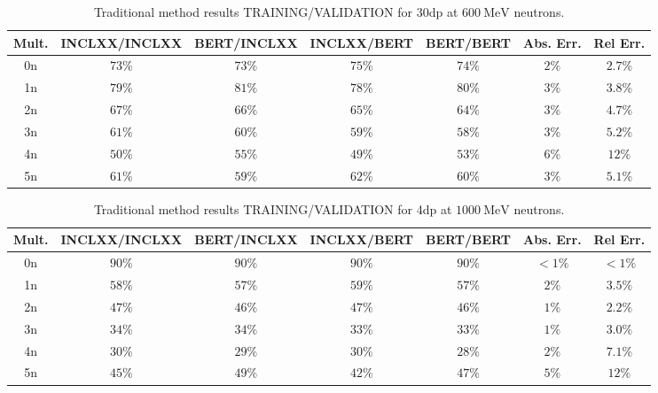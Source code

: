 \documentclass[10pt,a4paper]{report}
\newcommand{\MeV}[0]{\ \textrm{MeV}}
\begin{document}
\begin{table}[htbp] 
\centering
\caption{Traditional method results TRAINING/VALIDATION for \textrm{30dp} at ${600 \MeV}$ neutrons.}
\label{tab:30dp600}
\begin{tabular}{| c | c c c c | c c |} 
\hline
Mult. & INCLXX/INCLXX & BERT/INCLXX & INCLXX/BERT & BERT/BERT & Abs. Err. & Rel Err.   \\
\hline
0n    & ${73 \%}$     & ${73 \%}$   & ${75 \%}$   & ${74 \%}$ & ${2 \%}$  & ${2.7 \%}$ \\
1n    & ${79 \%}$     & ${81 \%}$   & ${78 \%}$   & ${80 \%}$ & ${3 \%}$  & ${3.8 \%}$ \\
2n    & ${67 \%}$     & ${66 \%}$   & ${65 \%}$   & ${64 \%}$ & ${3 \%}$  & ${4.7 \%}$ \\
3n    & ${61 \%}$     & ${60 \%}$   & ${59 \%}$   & ${58 \%}$ & ${3 \%}$  & ${5.2 \%}$ \\
4n    & ${50 \%}$     & ${55 \%}$   & ${49 \%}$   & ${53 \%}$ & ${6 \%}$  & ${12 \%}$  \\
5n    & ${61 \%}$     & ${59 \%}$   & ${62 \%}$   & ${60 \%}$ & ${3 \%}$  & ${5.1 \%}$ \\
\hline
\end{tabular}
\end{table}


\begin{table}[htbp] 
\centering
\caption{Traditional method results TRAINING/VALIDATION for \textrm{4dp} at ${1000 \MeV}$ neutrons.}
\label{tab:4dp1000}
\begin{tabular}{| c | c c c c | c c |} 
\hline
Mult. & INCLXX/INCLXX & BERT/INCLXX & INCLXX/BERT & BERT/BERT & Abs. Err. & Rel Err.   \\
\hline
0n    & ${90 \%}$     & ${90 \%}$   & ${90 \%}$   & ${90 \%}$ & ${<1 \%}$ & ${<1 \%}$  \\
1n    & ${58 \%}$     & ${57 \%}$   & ${59 \%}$   & ${57 \%}$ & ${2 \%}$  & ${3.5 \%}$ \\
2n    & ${47 \%}$     & ${46 \%}$   & ${47 \%}$   & ${46 \%}$ & ${1 \%}$  & ${2.2 \%}$ \\
3n    & ${34 \%}$     & ${34 \%}$   & ${33 \%}$   & ${33 \%}$ & ${1 \%}$  & ${3.0 \%}$ \\
4n    & ${30 \%}$     & ${29 \%}$   & ${30 \%}$   & ${28 \%}$ & ${2 \%}$  & ${7.1 \%}$ \\
5n    & ${45 \%}$     & ${49 \%}$   & ${42 \%}$   & ${47 \%}$ & ${5 \%}$  & ${12 \%}$  \\
\hline
\end{tabular}
\end{table}
\end{document}
